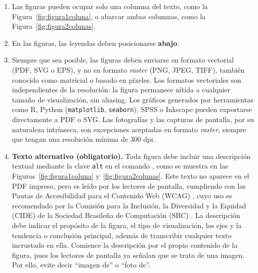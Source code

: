 \documentclass[spanish]{rbie2026}%
\begin{document}
\begin{enumerate}
    \item Las figuras pueden ocupar solo una columna del texto, como la Figura~\ref{fig:figura1coluna}, o abarcar ambas columnas, como la Figura~\ref{fig:figura2colunas}.

    \item En las figuras, las leyendas deben posicionarse \textbf{abajo}.

    \item Siempre que sea posible, las figuras deben enviarse en formato vectorial (PDF, SVG o EPS), y no en formato \textit{raster} (PNG, JPEG, TIFF), también conocido como matricial o basado en píxeles. Los formatos vectoriales son independientes de la resolución: la figura permanece nítida a cualquier tamaño de visualización, sin aliasing. Los gráficos generados por herramientas como R, Python (\texttt{matplotlib}, \texttt{seaborn}), SPSS o Inkscape pueden exportarse directamente a PDF o SVG. Las fotografías y las capturas de pantalla, por su naturaleza intrínseca, son excepciones aceptadas en formato \textit{raster}, siempre que tengan una resolución mínima de 300 dpi.

    \item \textbf{Texto alternativo (obligatorio).} Toda figura debe incluir una descripción textual mediante la clave \texttt{alt} en el comando , como se muestra en las Figuras~\ref{fig:figura1coluna} y~\ref{fig:figura2colunas}. Este texto no aparece en el PDF impreso, pero es leído por los lectores de pantalla, cumpliendo con las Pautas de Accesibilidad para el Contenido Web (WCAG) \citep{W3C2023wcag22}, cuyo uso es recomendado por la Comisión para la Inclusión, la Diversidad y la Equidad (CIDE) de la Sociedad Brasileña de Computación (SBC) \citep{sbc2025panorama}. La descripción debe indicar el propósito de la figura, el tipo de visualización, los ejes y la tendencia o conclusión principal, además de transcribir cualquier texto incrustado en ella. Comience la descripción por el propio contenido de la figura, pues los lectores de pantalla ya señalan que se trata de una imagen. Por ello, evite decir ``imagen de'' o ``foto de''.
\end{enumerate}
\end{document}
